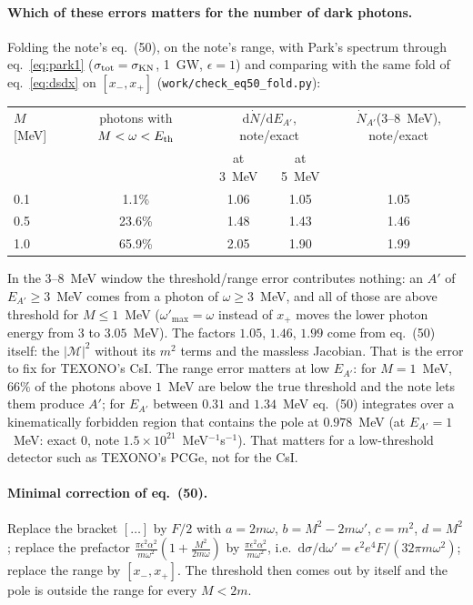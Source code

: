\documentclass[11pt,a4paper]{article}
\newcommand{\Ap}{A'}
\newcommand{\eps}{\epsilon}
\newcommand{\KN}{\mathrm{KN}}
\newcommand{\dd}{\mathrm{d}}
\begin{document}
\paragraph{Which of these errors matters for the number of dark photons.} Folding the note's eq.~(50), on the note's
range, with Park's spectrum through eq.~\eqref{eq:park1} ($\sigma_{\rm tot}=\sigma_\KN$, 1~GW, $\eps=1$) and comparing
with the same fold of eq.~\eqref{eq:dsdx} on $[x_-,x_+]$ (\texttt{work/check\_eq50\_fold.py}):
\begin{center}\small
\begin{tabular}{@{}lcccc@{}}
\toprule
$M$ [MeV] & photons with $M<\omega<E_{\rm th}$ & \multicolumn{2}{c}{$\dd\dot N/\dd E_{\Ap}$, note/exact} & $\dot N_{\Ap}$(3--8~MeV), note/exact\\
 & & at 3~MeV & at 5~MeV & \\
\midrule
0.1 & 1.1\% & 1.06 & 1.05 & 1.05\\
0.5 & 23.6\% & 1.48 & 1.43 & 1.46\\
1.0 & 65.9\% & 2.05 & 1.90 & 1.99\\
\bottomrule
\end{tabular}
\end{center}
In the 3--8~MeV window the threshold/range error contributes nothing: an $\Ap$ of $E_{\Ap}\ge3$~MeV comes from a photon
of $\omega\ge3$~MeV, and all of those are above threshold for $M\le1$~MeV ($\omega'_{\max}=\omega$ instead of $x_+$
moves the lower photon energy from $3$ to $3.05$~MeV). The factors $1.05$, $1.46$, $1.99$ come from eq.~(50) itself: the
$|\mathcal M|^2$ without its $m^2$ terms and the massless Jacobian. That is the error to fix for TEXONO's CsI.
The range error matters at low $E_{\Ap}$: for $M=1$~MeV, $66\%$ of the photons above $1$~MeV are below the true threshold
and the note lets them produce $\Ap$; for $E_{\Ap}$ between $0.31$ and $1.34$~MeV eq.~(50) integrates over a
kinematically forbidden region that contains the pole at $0.978$~MeV (at $E_{\Ap}=1$~MeV: exact $0$, note
$1.5\times10^{21}$~MeV$^{-1}$s$^{-1}$). That matters for a low-threshold detector such as TEXONO's PCGe, not for the CsI.

\paragraph{Minimal correction of eq.~(50).} Replace the bracket $[\ldots]$ by $F/2$ with $a=2m\omega$, $b=M^2-2m\omega'$,
$c=m^2$, $d=M^2$; replace the prefactor $\frac{\pi\eps^2\alpha^2}{m\omega^2}(1+\frac{M^2}{2m\omega})$ by
$\frac{\pi\eps^2\alpha^2}{m\omega^2}$, i.e.\ $\dd\sigma/\dd\omega'=\eps^2e^4F/(32\pi m\omega^2)$; replace the range by
$[x_-,x_+]$. The threshold then comes out by itself and the pole is outside the range for every $M<2m$.
\end{document}
